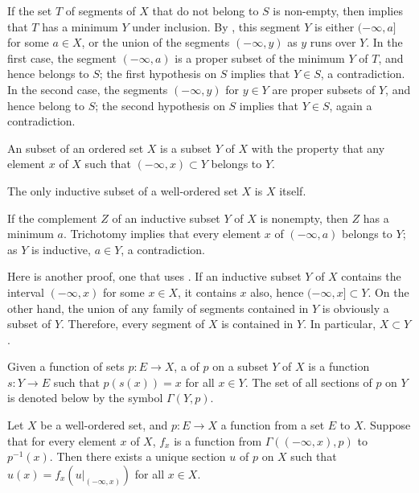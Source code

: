 \documentclass{article}
\begin{document}
If the set \(T\) of segments of \(X\) that do not belong to \(S\) is
non-empty, then  implies that \(T\) has a minimum
\(Y\) under inclusion.  By , this segment \(Y\) is
either \((-\infty, a]\) for some \(a \in X\), or the union of the
segments \((-\infty, y)\) as \(y\) runs over \(Y\).  In the first
case, the segment \((-\infty, a)\) is a proper subset of the minimum
\(Y\) of \(T\), and hence belongs to \(S\); the first hypothesis on
\(S\) implies that \(Y \in S\), a contradiction.  In the second case,
the segments \((-\infty, y)\) for \(y \in Y\) are proper subsets of
\(Y\), and hence belong to \(S\); the second hypothesis on \(S\)
implies that \(Y \in S\), again a contradiction.

An  subset of an ordered set \(X\) is a subset
\(Y\) of \(X\) with the property that any element \(x\) of \(X\) such
that \((-\infty, x) \subset Y\) belongs to \(Y\).

\begin{theorem}
  \label{thm:5vxgawq0}
  The only inductive subset of a well-ordered set \(X\) is \(X\)
  itself.
\end{theorem}

If the complement \(Z\) of an inductive subset \(Y\) of \(X\) is
nonempty, then \(Z\) has a minimum \(a\).  Trichotomy implies that
every element \(x\) of \((-\infty, a)\) belongs to \(Y\); as \(Y\) is
inductive, \(a \in Y\), a contradiction.

Here is another proof, one that uses .  If an
inductive subset \(Y\) of \(X\) contains the interval \((-\infty, x)\)
for some \(x \in X\), it contains \(x\) also, hence
\((-\infty, x] \subset Y\).  On the other hand, the union of any
family of segments contained in \(Y\) is obviously a subset of \(Y\).
Therefore, every segment of \(X\) is contained in \(Y\).  In
particular, \(X \subset Y\).

Given a function of sets \(p : E \to X\), a  of
\(p\) on a subset \(Y\) of \(X\) is a function \(s : Y \to E\) such
that \(p(s(x)) = x\) for all \(x \in Y\).  The set of all sections of
\(p\) on \(Y\) is denoted below by the symbol \(\Gamma(Y, p)\).

\begin{theorem}
  \label{thm:srxrngd8}
  Let \(X\) be a well-ordered set, and \(p : E \to X\) a function from
  a set \(E\) to \(X\).  Suppose that for every element \(x\) of
  \(X\), \(f_x\) is a function from \(\Gamma((-\infty, x), p)\) to
  \(p^{-1}(x)\).  Then there exists a unique section \(u\) of \(p\) on
  \(X\) such that \(u(x) = f_x(u \vert_{(-\infty, x)})\) for all
  \(x \in X\).
\end{theorem}
\end{document}
